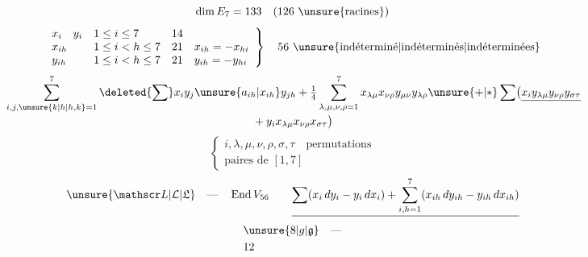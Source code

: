 \[
 \dim E_7=133\quad(126\ \text{\unsure{racines}})
\]
\[
\left.\begin{array}{llll}
 x_i\quad y_{i} &1\le i\le7&14&\\
 x_{ih}&1\le i<h\le7&21&x_{ih}=-x_{hi}\\
 y_{ih}&1\le i<h\le7&21&y_{ih}=-y_{hi}
\end{array}\right\}\quad56\ \text{\unsure{indéterminé|indéterminés|indéterminées}}
\]
\[
\begin{aligned}
 &\sum_{i,j,\unsure{k|h|h,k}=1}^{7}\deleted{\sum}x_i y_j\unsure{a_{ih}|x_{ih}}y_{jh}
 +\tfrac14\sum_{\lambda,\mu,\nu,\rho=1}^{7}x_{\lambda\mu}x_{\nu\rho}y_{\mu\nu}y_{\lambda\rho}
 \unsure{+|\ast}\sum\bigl(\underline{x_i y_{\lambda\mu}y_{\nu\rho}y_{\sigma\tau}}\\[-2pt]
 &\hspace{22em}{}+y_i x_{\lambda\mu}x_{\nu\rho}x_{\sigma\tau}\bigr)
\end{aligned}
\]
\[
 \left\{\begin{gathered}
 i,\lambda,\mu,\nu,\rho,\sigma,\tau\quad\text{permutations}\\
 \text{paires de }[1,7]
 \end{gathered}\right.
\]
\[
\unsure{\mathscr L|\mathcal L|\mathfrak L}\quad\text{---}\quad \operatorname{End} V_{56}
\qquad
\underline{\sum(x_i\,dy_i-y_i\,dx_i)+
 \sum_{i,h=1}^{7}(x_{ih}\,dy_{ih}-y_{ih}\,dx_{ih})}
\]
\[
\begin{aligned}
 &\unsure{8|g|\mathfrak g}\quad\text{---}\\
 &12
\end{aligned}
\]
